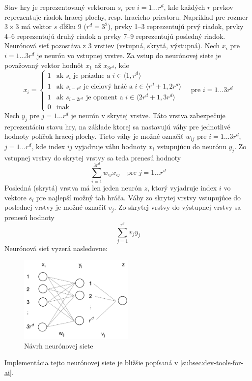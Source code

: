 Stav hry je reprezentovaný vektorom $s_i$ pre $i=1 \dots r^d$, kde každých $r$ prvkov reprezentuje riadok hracej plochy,
resp. hracieho priestoru.
Napríklad pre rozmer $3 \times 3$ má vektor $s$ dĺžku 9 ($r^d=3^2$), prvky 1--3 reprezentujú prvý riadok, prvky
4--6 reprezentujú druhý riadok a prvky 7--9 reprezentujú posledný riadok.
Neurónová sieť pozostáva z 3 vrstiev (vstupná, skrytá, výstupná).
Nech $x_i$ pre $i=1 \dots 3r^d$ je neurón vo vstupnej vrstve.
Za vstup do neurónovej siete je považovaný vektor hodnôt $x_1$ až $x_{3r^d}$, kde
\begin{equation}
    x_i=
    \begin{cases}
        1 & \text{ak }s_i\text{ je prázdne a } i \in \langle 1, r^d \rangle \\
        1 & \text{ak }s_{i-r^d}\text{ je cieľový hráč a } i \in \langle r^d+1, 2r^d \rangle \\
        1 & \text{ak }s_{i-2r^d}\text{ je oponent a } i \in \langle 2r^d+1, 3r^d \rangle \\
        0 & \text{inak}
    \end{cases}
    \quad
    \text{pre }i=1 \dots 3r^d
\end{equation}
Nech $y_j$ pre $j=1 \dots r^d$ je neurón v skrytej vrstve.
Táto vrstva zabezpečuje reprezentáciu stavu hry, na základe ktorej sa nastavujú váhy pre jednotlivé hodnoty políčok
hracej plochy.
Tieto váhy je možné označiť $w_{ij}$ pre $i=1 \dots 3r^d$, $j=1 \dots r^d$, kde index $ij$ vyjadruje váhu hodnoty
$x_i$ vstupujúcu do neurónu $y_j$.
Zo vstupnej vrstvy do skrytej vrstvy sa teda prenesú hodnoty
\begin{equation}
    \sum_{i=1}^{3r^d} w_{ij}x_{ij} \quad \text{pre } j=1 \dots r^d
\end{equation}
Posledná (skrytá) vrstva má len jeden neurón $z$, ktorý vyjadruje index $i$ vo vektore $s_i$ pre najlepší možný ťah
hráča.
Váhy zo skrytej vrstvy vstupujúce do poslednej vrstvy je možné označiť $v_j$.
Zo skrytej vrstvy do výstupnej vrstvy sa prenesú hodnoty
\begin{equation}
    \sum_{j=1}^{r^d} v_{j}y_{j}
\end{equation}
Neurónová sieť vyzerá nasledovne:

\begin{figure}[H]
    \centering
    \includegraphics[width=0.5\textwidth]{images/ann.jpg}
    \caption{Návrh neurónovej siete}
\end{figure}
Implementácia tejto neurónovej siete je bližšie popísaná v \autoref{subsec:dev-tools-for-ai}.
